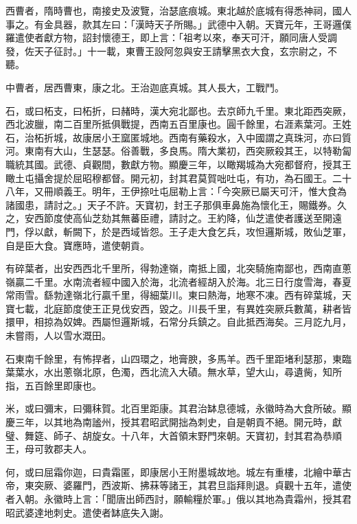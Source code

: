 \begin{pinyinscope}
 西曹者，隋時曹也，南接史及波覽，治瑟底痕城。東北越於底城有得悉神祠，國人事之。有金具器，款其左曰：「漢時天子所賜。」武德中入朝。天寶元年，王哥邏僕羅遣使者獻方物，詔封懷德王，即上言：「祖考以來，奉天可汗，願同唐人受調發，佐天子征討。」十一載，東曹王設阿忽與安王請擊黑衣大食，玄宗尉之，不聽。



 中曹者，居西曹東，康之北。王治迦底真城。其人長大，工戰鬥。



 石，或曰柘支，曰柘折，曰赭時，漢大宛北鄙也。去京師九千里。東北距西突厥，西北波臘，南二百里所抵俱戰提，西南五百里康也。圓千餘里，右涯素葉河。王姓石，治柘折城，故康居小王窳匿城地。西南有藥殺水，入中國謂之真珠河，亦曰質河。東南有大山，生瑟瑟。俗善戰，多良馬。隋大業初，西突厥殺其王，以特勒匐職統其國。武德、貞觀間，數獻方物。顯慶三年，以瞰羯城為大宛都督府，授其王瞰土屯攝舍提於屈昭穆都督。開元初，封其君莫賀咄吐屯，有功，為石國王。二十八年，又冊順義王。明年，王伊捺吐屯屈勒上言：「今突厥已屬天可汗，惟大食為諸國患，請討之。」天子不許。天寶初，封王子那俱車鼻施為懷化王，賜鐵券。久之，安西節度使高仙芝劾其無蕃臣禮，請討之。王約降，仙芝遣使者護送至開遠門，俘以獻，斬闕下，於是西域皆怨。王子走大食乞兵，攻怛邏斯城，敗仙芝軍，自是臣大食。寶應時，遣使朝貢。



 有碎葉者，出安西西北千里所，得勃達嶺，南抵上國，北突騎施南鄙也，西南直蔥嶺贏二千里。水南流者經中國入於海，北流者經胡入於海。北三日行度雪海，春夏常雨雪。繇勃達嶺北行贏千里，得細葉川。東曰熱海，地寒不凍。西有碎葉城，天寶七載，北庭節度使王正見伐安西，毀之。川長千里，有異姓突厥兵數萬，耕者皆擐甲，相掠為奴婢。西屬怛邏斯城，石常分兵鎮之。自此抵西海矣。三月訖九月，未嘗雨，人以雪水溉田。



 石東南千餘里，有怖捍者，山四環之，地膏腴，多馬羊。西千里距堵利瑟那，東臨葉葉水，水出蔥嶺北原，色濁，西北流入大磧。無水草，望大山，尋遺胔，知所指，五百餘里即康也。



 米，或曰彌末，曰彌秣賀。北百里距康。其君治缽息德城，永徽時為大食所破。顯慶三年，以其地為南謐州，授其君昭武開拙為刺史，自是朝貢不絕。開元時，獻璧、舞筵、師子、胡旋女。十八年，大首領末野門來朝。天寶初，封其君為恭順王，母可敦郡夫人。



 何，或曰屈霜你迦，曰貴霜匿，即康居小王附墨城故地。城左有重樓，北繪中華古帝，東突厥、婆羅門，西波斯、拂菻等諸王，其君旦詣拜則退。貞觀十五年，遣使者入朝。永徽時上言：「聞唐出師西討，願輸糧於軍。」俄以其地為貴霜州，授其君昭武婆達地刺史。遣使者缽底失入謝。




\end{pinyinscope}
